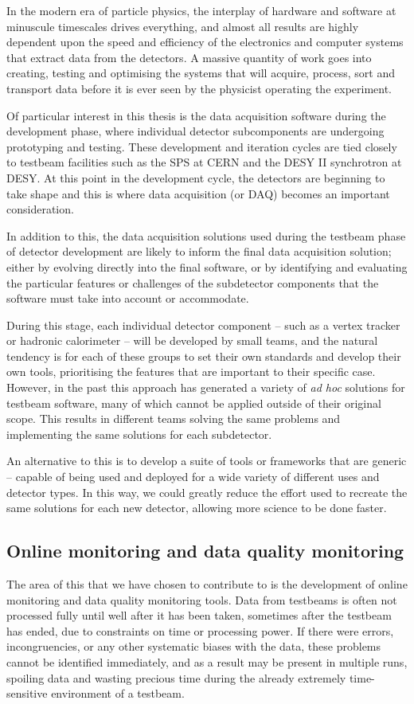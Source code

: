 In the modern era of particle physics, the interplay of hardware and software at minuscule timescales drives everything, and almost all results are highly dependent upon the speed and efficiency of the electronics and computer systems that extract data from the detectors. A massive quantity of work goes into creating, testing and optimising the systems that will acquire, process, sort and transport data before it is ever seen by the physicist operating the experiment.

Of particular interest in this thesis is the data acquisition software during the development phase, where individual detector subcomponents are undergoing prototyping and testing. These development and iteration cycles are tied closely to testbeam facilities such as the \acrfull{SPS} at \acrshort{CERN} and the DESY II synchrotron at \acrshort{DESY}. At this point in the development cycle, the detectors are beginning to take shape and this is where data acquisition (or \acrshort{DAQ}) becomes an important consideration. 

In addition to this, the data acquisition solutions used during the testbeam phase of detector development are likely to inform the final data acquisition solution; either by evolving directly into the final software, or by identifying and evaluating the particular features or challenges of the subdetector components that the software must take into account or accommodate.

During this stage, each individual detector component -- such as a vertex tracker or hadronic calorimeter -- will be developed by small teams, and the natural tendency is for each of these groups to set their own standards and develop their own tools, prioritising the features that are important to their specific case. However, in the past this approach has generated a variety of \textit{ad hoc} solutions for testbeam software, many of which cannot be applied outside of their original scope. This results in different teams solving the same problems and implementing the same solutions for each subdetector.

An alternative to this is to develop a suite of tools or frameworks that are generic -- capable of being used and deployed for a wide variety of different uses and detector types. In this way, we could greatly reduce the effort used to recreate the same solutions for each new detector, allowing more science to be done faster.

\subsection{Online monitoring and data quality monitoring}
The area of this that we have chosen to contribute to is the development of online monitoring and data quality monitoring tools. Data from testbeams is often not processed fully until well after it has been taken, sometimes after the testbeam has ended, due to constraints on time or processing power. If there were errors, incongruencies, or any other systematic biases with the data, these problems cannot be identified immediately, and as a result may be present in multiple runs, spoiling data and wasting precious time during the already extremely time-sensitive environment of a testbeam.

